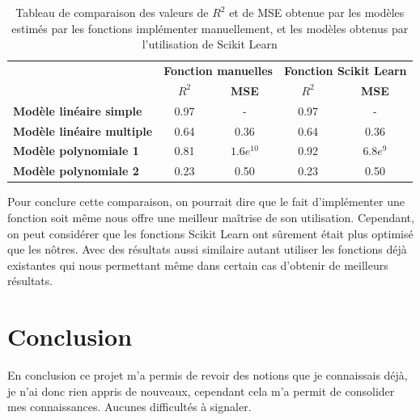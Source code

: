 \documentclass[french]{article}
\begin{document}
\begin{table}[!htbp]
\begin{tabular}{l|cc|cc|}
\cline{2-5}
                                                        & \multicolumn{2}{l|}{\textbf{Fonction manuelles}}     & \multicolumn{2}{l|}{\textbf{Fonction Scikit Learn}}  \\ \cline{2-5} 
                                                        & \multicolumn{1}{c|}{\textbf{$R^{2}$}} & \textbf{MSE} & \multicolumn{1}{c|}{\textbf{$R^{2}$}} & \textbf{MSE} \\ \hline
\multicolumn{1}{|l|}{\textbf{Modèle linéaire simple}}   & \multicolumn{1}{c|}{0.97}             & -            & \multicolumn{1}{c|}{0.97}             & -            \\ \hline
\multicolumn{1}{|l|}{\textbf{Modèle linéaire multiple}} & \multicolumn{1}{c|}{0.64}             & 0.36         & \multicolumn{1}{c|}{0.64}             & 0.36         \\ \hline
\multicolumn{1}{|l|}{\textbf{Modèle polynomiale 1}}     & \multicolumn{1}{c|}{0.81}             & $1.6e^{10}$  & \multicolumn{1}{c|}{0.92}             & $6.8e^{9}$   \\ \hline
\multicolumn{1}{|l|}{\textbf{Modèle polynomiale 2}}     & \multicolumn{1}{c|}{0.23}             & 0.50         & \multicolumn{1}{c|}{0.23}             & 0.50         \\ \hline
\end{tabular}
\caption{Tableau de comparaison des valeurs de $R^{2}$ et de MSE obtenue par les modèles estimés par les fonctions implémenter manuellement, et les modèles obtenus par l'utilisation de Scikit Learn}
\label{tab:comparatif}
\end{table}

Pour conclure cette comparaison, on pourrait dire que le fait d'implémenter une fonction soit même nous offre une meilleur maîtrise de son utilisation. Cependant, on peut considérer que les fonctions Scikit Learn ont sûrement était plus optimisé que les nôtres. Avec des résultats aussi similaire autant utiliser les fonctions déjà existantes qui nous permettant même dans certain cas d'obtenir de meilleurs résultats.

\section{Conclusion}

En conclusion ce projet m'a permis de revoir des notions que je connaissais déjà, je n'ai donc rien appris de nouveaux, cependant cela m'a permit de consolider mes connaissances. Aucunes difficultés à signaler.
\end{document}
